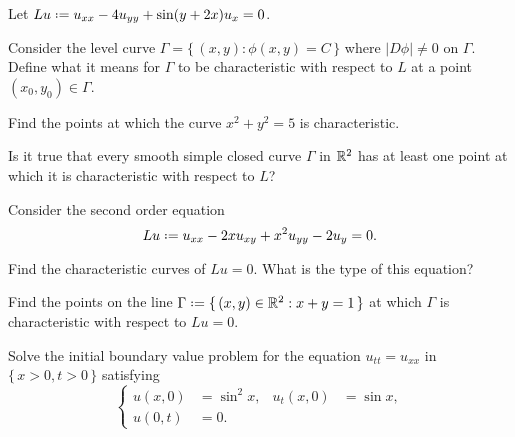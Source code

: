 \begin{problem}
  Let \(Lu\defeq u_{xx}-4u_{yy}+\sin(y+2x)u_{x}=0\).
  \begin{alphlist}
  \item Consider the level curve \(\Gamma=\{\,(x,y):\phi(x,y)=C\,\}\)
    where \(|D\phi|\neq 0\) on \(\Gamma\). Define what it means for
    \(\Gamma\) to be characteristic with respect to \(L\) at a point
    \((x_0,y_0)\in\Gamma\).
  \item Find the points at which the curve \(x^2+y^2=5\) is
    characteristic.
  \item Is it true that every smooth simple closed curve \(\Gamma\) in
    \(\mathbb{R}^2\) has at least one point at which it is characteristic with
    respect to \(L\)?
  \end{alphlist}
\end{problem}
\begin{solution*}
\end{solution*}

\begin{problem}
  Consider the second order equation
  \[
    Lu\defeq u_{xx}-2xu_{xy}+x^2u_{yy}-2u_y=0.
  \]
  \begin{alphlist}
  \item Find the characteristic curves of \(Lu=0\). What is the type of
    this equation?
  \item Find the points on the line
    \(\Gamma\defeq\{\,(x,y)\in\R^2:x+y=1\,\}\) at which \(\Gamma\) is
    characteristic with respect to \(Lu=0\).
  \end{alphlist}
\end{problem}
\begin{solution*}
\end{solution*}

\begin{problem}
  Solve the initial boundary value problem for the equation
  \(u_{tt}=u_{xx}\) in \(\{\,x>0,t>0\,\}\) satisfying
    \[
     \left\{
       \begin{aligned}
         u(x,0)&=\sin^2x,&u_t(x,0)&=\sin x,\\
         u(0,t)&=0.
      \end{aligned}
    \right.
  \]
\end{problem}
\begin{solution*}
\end{solution*}

